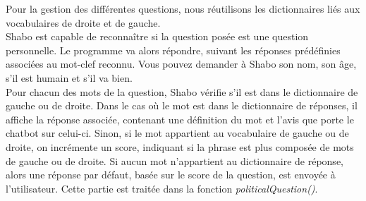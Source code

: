 \documentclass[paper=a4]{article}
\begin{document}
Pour la gestion des différentes questions, nous réutilisons les
dictionnaires liés aux vocabulaires de droite et de gauche. \\

Shabo est capable de reconnaître si la question posée est une question
personnelle. Le programme va alors répondre, suivant les réponses
prédéfinies associées au mot-clef reconnu. Vous pouvez demander à Shabo
son nom, son âge, s'il est humain et s'il va bien.\\

Pour chacun des mots de la question, Shabo vérifie s'il est dans le
dictionnaire de gauche ou de droite. Dans le cas où le mot est dans le
dictionnaire de réponses, il affiche la
réponse associée, contenant une définition du mot et l'avis que porte
le chatbot sur celui-ci. Sinon, si le mot appartient au vocabulaire de gauche
ou de droite, on incrémente un score, indiquant si la phrase est plus
composée de mots de gauche ou de droite. Si aucun mot n'appartient au
dictionnaire de réponse, alors une réponse par défaut, basée sur le
score de la question, est envoyée à l'utilisateur. Cette partie est
traitée dans la fonction \textit{politicalQuestion()}. \\
\end{document}
